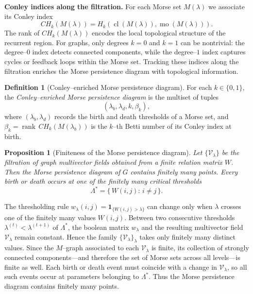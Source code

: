 \documentclass{article}
\theoremstyle{definition}
\newtheorem{definition}{Definition}
\theoremstyle{plain}
\newtheorem{proposition}{Proposition}
\theoremstyle{remark}
\newcommand{\1}{\mathbbm{1}}  %
\renewenvironment{proof}{{\bf Proof:\ }}{\qedsymbol}%
\begin{document}
\medskip
\noindent
\textbf{Conley indices along the filtration.}
For each Morse set $M(\lambda)$ we associate its Conley index
\[
CH_k(M(\lambda)) =
H_k(\operatorname{cl}(M(\lambda)), \operatorname{mo}(M(\lambda))).
\]
The rank of $CH_k(M(\lambda))$ encodes the local topological structure
of the recurrent region.  
For graphs, only degrees $k=0$ and $k=1$ can be nontrivial: the
degree--$0$ index detects connected components, while the degree--$1$
index captures cycles or feedback loops within the Morse set.  
Tracking these indices along the filtration enriches the Morse
persistence diagram with topological information.

\begin{definition}[Conley--enriched Morse persistence diagram]
For each $k\in\{0,1\}$, the \emph{Conley--enriched Morse persistence
diagram} is the multiset of tuples
\[
(\lambda_b, \lambda_d, k, \beta_k),
\]
where $(\lambda_b,\lambda_d)$ records the birth and death thresholds of
a Morse set, and $\beta_k=\operatorname{rank}\,CH_k(M(\lambda_b))$ is
the $k$--th Betti number of its Conley index at birth.
\end{definition}

\begin{proposition}[Finiteness of the Morse persistence diagram]
\label{prop:finite-diagram}
Let $\{\mathcal V_\lambda\}$ be the filtration of graph multivector
fields obtained from a finite relation matrix $W$.  Then the Morse
persistence diagram of $G$ contains finitely many points.  
Every birth or death occurs at one of the finitely many critical
thresholds
\[
\Lambda^*=\{\,W(i,j):\,i\ne j\,\}.
\]
\end{proposition}

\begin{proof}
The thresholding rule
$w_\lambda(i,j)=\mathbf{1}_{\{W(i,j)>\lambda\}}$
can change only when $\lambda$ crosses one of the finitely many
values $W(i,j)$.
Between two consecutive thresholds
$\lambda^{(t)} < \lambda^{(t+1)}$ of $\Lambda^*$,
the boolean matrix $w_\lambda$ and the resulting multivector field
$\mathcal V_\lambda$ remain constant.  
Hence the family $\{\mathcal V_\lambda\}_\lambda$ takes only finitely
many distinct values.  
Since the $M$--graph associated to each $\mathcal V_\lambda$ is finite,
its collection of strongly connected components—and therefore the set of
Morse sets across all levels—is finite as well.  
Each birth or death event must coincide with a change in
$\mathcal V_\lambda$, so all such events occur at parameters belonging to
$\Lambda^*$.  
Thus the Morse persistence diagram contains finitely many points.
\end{proof} 
\end{document}
